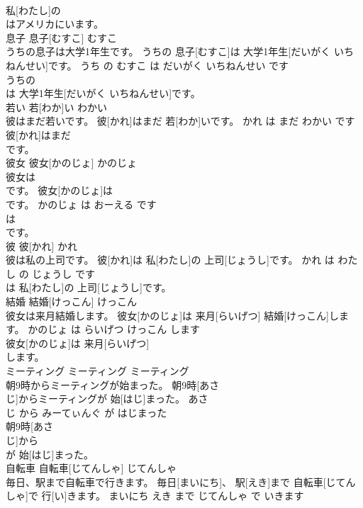 \documentclass[8pt]{extreport}
\begin{document}
\begin{CJK}{UTF8}{min}
\\	私[わたし]の
\\	はアメリカにいます。			
\\	息子	息子[むすこ]	むすこ	
\\	うちの息子は大学1年生です。	うちの 息子[むすこ]は 大学1年生[だいがく いちねんせい]です。	うち の むすこ は だいがく いちねんせい です	
\\	うちの
\\	は 大学1年生[だいがく いちねんせい]です。			
\\	若い	若[わか]い	わかい	
\\	彼はまだ若いです。	彼[かれ]はまだ 若[わか]いです。	かれ は まだ わかい です	
\\	彼[かれ]はまだ
\\	です。			
\\	彼女	彼女[かのじょ]	かのじょ	
\\	彼女は
\\	です。	彼女[かのじょ]は 
\\	[おーえる]です。	かのじょ は おーえる です	
\\	は 
\\	[おーえる]です。			
\\	彼	彼[かれ]	かれ	
\\	彼は私の上司です。	彼[かれ]は 私[わたし]の 上司[じょうし]です。	かれ は わたし の じょうし です	
\\	は 私[わたし]の 上司[じょうし]です。			
\\	結婚	結婚[けっこん]	けっこん	
\\	彼女は来月結婚します。	彼女[かのじょ]は 来月[らいげつ] 結婚[けっこん]します。	かのじょ は らいげつ けっこん します	
\\	彼女[かのじょ]は 来月[らいげつ]
\\	します。			
\\	ミーティング	ミーティング	ミーティング	
\\	朝9時からミーティングが始まった。	朝9時[あさ 
\\	じ]からミーティングが 始[はじ]まった。	あさ 
\\	じ から みーてぃんぐ が はじまった	
\\	朝9時[あさ 
\\	じ]から
\\	が 始[はじ]まった。			
\\	自転車	自転車[じてんしゃ]	じてんしゃ	
\\	毎日、駅まで自転車で行きます。	毎日[まいにち]、 駅[えき]まで 自転車[じてんしゃ]で 行[い]きます。	まいにち えき まで じてんしゃ で いきます	

\end{CJK}
\end{document}
